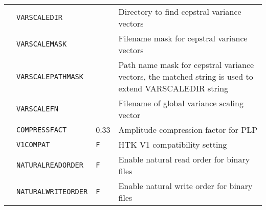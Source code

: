 \begin{center}
\begin{supertabular}{|p{1.8cm}|l|l|p{6.6cm}|}
  & \texttt{VARSCALEDIR} &  & Directory to find cepstral variance vectors  \\ 
  & \texttt{VARSCALEMASK} &  & Filename mask for cepstral variance vectors  \\ 
  & \texttt{VARSCALEPATHMASK} &  & Path name mask for cepstral variance vectors, the matched string is used to extend VARSCALEDIR string\\ 
  & \texttt{VARSCALEFN} &  & Filename of global variance scaling vector \\ 
  & \texttt{COMPRESSFACT} & 0.33 & Amplitude compression factor for PLP \\ \hline

   
  & \texttt{V1COMPAT} & \texttt{F} & HTK V1 compatibility setting \\ \hline



  & \texttt{NATURALREADORDER} & \texttt{F} & Enable natural read order for binary files \\  
  & \texttt{NATURALWRITEORDER} & \texttt{F} & Enable natural write order for binary files \\ \hline


\end{supertabular}
\end{center}
